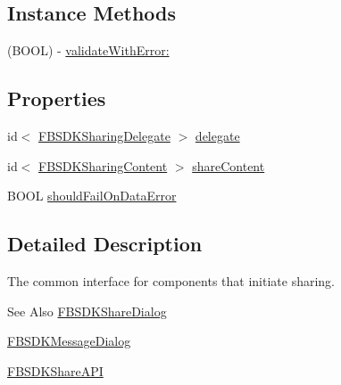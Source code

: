 \subsection*{Instance Methods}
\begin{DoxyCompactItemize}
\item 
(B\-O\-O\-L) -\/ \hyperlink{protocol_f_b_s_d_k_sharing-p_af70f439e9b7caf3671d798c29458fe59}{validate\-With\-Error\-:}
\end{DoxyCompactItemize}
\subsection*{Properties}
\begin{DoxyCompactItemize}
\item 
id$<$ \hyperlink{protocol_f_b_s_d_k_sharing_delegate-p}{F\-B\-S\-D\-K\-Sharing\-Delegate} $>$ \hyperlink{protocol_f_b_s_d_k_sharing-p_a310585baeb89d309bda3879aaa1be72d}{delegate}
\item 
id$<$ \hyperlink{protocol_f_b_s_d_k_sharing_content-p}{F\-B\-S\-D\-K\-Sharing\-Content} $>$ \hyperlink{protocol_f_b_s_d_k_sharing-p_a9cc352e3d8e8aec628ba42e8718bbeaf}{share\-Content}
\item 
B\-O\-O\-L \hyperlink{protocol_f_b_s_d_k_sharing-p_ac1c01a21db7b956e8ea47df72f01d12d}{should\-Fail\-On\-Data\-Error}
\end{DoxyCompactItemize}


\subsection{Detailed Description}
The common interface for components that initiate sharing. \begin{DoxySeeAlso}{See Also}
\hyperlink{interface_f_b_s_d_k_share_dialog}{F\-B\-S\-D\-K\-Share\-Dialog} 

\hyperlink{interface_f_b_s_d_k_message_dialog}{F\-B\-S\-D\-K\-Message\-Dialog} 

\hyperlink{interface_f_b_s_d_k_share_a_p_i}{F\-B\-S\-D\-K\-Share\-A\-P\-I} 
\end{DoxySeeAlso}


